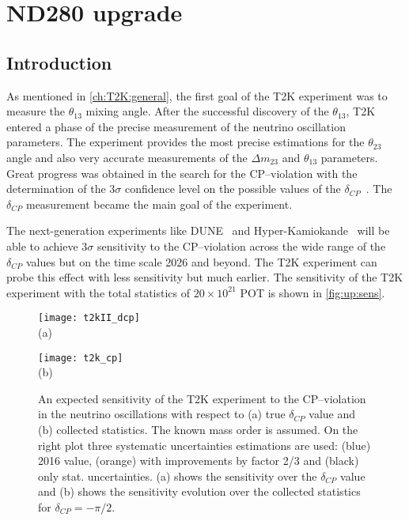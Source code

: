 \documentclass[main.tex]{subfiles}
\begin{document}
\renewcommand{\labelitemi}{\ding{226}}
\renewcommand{\labelitemii}{\ding{227}}

\part{ND280 upgrade}
\label{pt:up}

\chapter{Introduction}
\label{ch:up:motif}
As mentioned in \autoref{ch:T2K:general}, the first goal of the T2K experiment was to measure the $\theta_{13}$ mixing angle. After the successful discovery of the $\theta_{13}$, T2K entered a phase of the precise measurement of the neutrino oscillation parameters. The experiment provides the most precise estimations for the $\theta_{23}$ angle and also very accurate measurements of the $\Delta m_{23}$ and $\theta_{13}$ parameters. Great progress was obtained in the search for the CP--violation with the determination of the 3$\sigma$ confidence level on the possible values of the $\delta_{CP}$~\cite{Abe2020n}. The $\delta_{CP}$ measurement became the main goal of the experiment.

The next-generation experiments like DUNE~\cite{Acciarri2016} and Hyper-Kamiokande~\cite{Proto-Collaboration2018} will be able to achieve 3$\sigma$ sensitivity to the CP--violation across the wide range of the $\delta_{CP}$ values but on the time scale 2026 and beyond. The T2K experiment can probe this effect with less sensitivity but much earlier. The sensitivity of the T2K experiment with the total statistics of $20\times10^{21}$ POT is shown in \autoref{fig:up:sens}.

\begin{figure}[!ht]
  \centering
  \begin{minipage}{0.49\linewidth}
    \centering
    \texttt{[image: t2kII\_dcp]} \\ (a)
  \end{minipage}
  \begin{minipage}{0.49\linewidth}
    \centering
    \texttt{[image: t2k\_cp]} \\ (b)
  \end{minipage}
    \caption{An expected sensitivity of the T2K experiment to the CP--violation in the neutrino oscillations with respect to (a) true $\delta_{CP}$ value and (b) collected statistics. The known mass order is assumed. On the right plot three systematic uncertainties estimations are used: (blue) 2016 value, (orange) with improvements by factor 2/3 and (black) only stat. uncertainties. (a) shows the sensitivity over the $\delta_{CP}$ value and (b) shows the sensitivity evolution over the collected statistics for $\delta_{CP}=-\pi/2$.}
    \label{fig:up:sens}
\end{figure}
\end{document}
